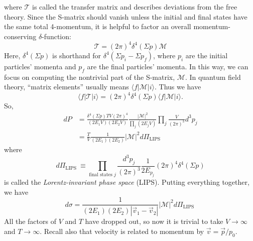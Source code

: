 \documentclass[aps,prb,superscriptaddress,nofootinbib]{revtex4}
\begin{document}
where $\mathcal{T}$ is called the transfer matrix and describes deviations from the free theory. 
Since the S-matrix should vanish unless the initial and final states have the same total 4-momentum, it is helpful to factor an overall momentum-conserving $\delta$-function:
\begin{equation}
	\mathcal{T}=(2 \pi)^{4} \delta^{4}(\Sigma p) \mathcal{M}
\end{equation}
Here, $\delta^{4}(\Sigma p)$ is shorthand for $\delta^{4}\left(\Sigma p_{i}-\Sigma p_{f}\right)$, where $p_{i}$ are the initial particles' momenta and $p_{f}$ are the final particles' momenta. 
In this way, we can focus on computing the nontrivial part of the S-matrix, $\mathcal{M}$. 
In quantum field theory, ``matrix elements'' usually means $\langle f|\mathcal{M}| i\rangle$. Thus we have
\begin{equation}
	\langle f|\mathcal T| i\rangle=(2 \pi)^{4} \delta^{4}(\Sigma p)\langle f|\mathcal{M}| i\rangle.
\end{equation}
So,
\begin{equation}
\begin{aligned}
	d P &=\frac{\delta^{4}(\Sigma p) T V(2 \pi)^{4}}{\left(2 E_{1} V\right)\left(2 E_{2} V\right)} \frac{|\mathcal{M}|^{2}}{\prod_{j}\left(2 E_{j} V\right)} \prod_{j} \frac{V}{(2 \pi)^{3}} d^{3} p_{j} \\
	&=\frac{T}{V} \frac{1}{\left(2 E_{1}\right)\left(2 E_{2}\right)}|\mathcal{M}|^{2} d \Pi_{\mathrm{LIPS}}
\end{aligned}
\end{equation}
where
\begin{equation}
	d \Pi_{\text {LIPS }} \equiv \prod_{\text {final states } j} \frac{d^{3} p_{j}}{(2 \pi)^{3}} \frac{1}{2 E_{p_{j}}}(2 \pi)^{4} \delta^{4}(\Sigma p)
\end{equation}
is called the \textit{Lorentz-invariant phase space} (LIPS).
Putting everything together, we have
\begin{equation}
	d \sigma=\frac{1}{\left(2 E_{1}\right)\left(2 E_{2}\right)\left|\vec{v}_{1}-\vec{v}_{2}\right|}|\mathcal{M}|^{2} d \Pi_{\text {LIPS }}
\end{equation}
All the factors of $V$ and $T$ have dropped out, so now it is trivial to take $V \rightarrow \infty$ and $T \rightarrow \infty$. Recall also that velocity is related to momentum by $\vec{v}=\vec{p} / p_{0}$.
\end{document}
